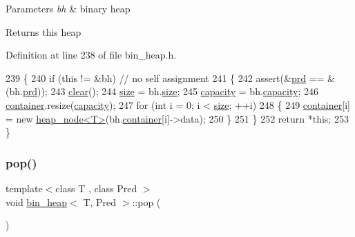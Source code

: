 \begin{DoxyParams}{Parameters}
{\em bh} & binary heap\\
\hline
\end{DoxyParams}
\begin{DoxyReturn}{Returns}
this heap 
\end{DoxyReturn}


Definition at line 238 of file bin\+\_\+heap.\+h.


\begin{DoxyCode}
239 \{
240     \textcolor{keywordflow}{if} (\textcolor{keyword}{this} != &bh)    \textcolor{comment}{// no self assignment}
241     \{
242     assert(&\mbox{\hyperlink{classbin__heap_a5ecc420dfd03a6a0b4c9328cac1fae14}{prd}} == &(bh.\mbox{\hyperlink{classbin__heap_a5ecc420dfd03a6a0b4c9328cac1fae14}{prd}}));
243     \mbox{\hyperlink{classbin__heap_abf7a6189fcb48e435fc156f764e38f1d}{clear}}();
244     \mbox{\hyperlink{classbin__heap_a8dde1008dcc24d734dbdb2c7ca50435b}{size}} = bh.\mbox{\hyperlink{classbin__heap_a8dde1008dcc24d734dbdb2c7ca50435b}{size}};
245     \mbox{\hyperlink{classbin__heap_ac5aa6948898bfc047cae2fe99ba28f57}{capacity}} = bh.\mbox{\hyperlink{classbin__heap_ac5aa6948898bfc047cae2fe99ba28f57}{capacity}};
246     \mbox{\hyperlink{classbin__heap_a413200f4c6e24090c5e9a32184fc8857}{container}}.resize(\mbox{\hyperlink{classbin__heap_ac5aa6948898bfc047cae2fe99ba28f57}{capacity}});
247     \textcolor{keywordflow}{for} (\textcolor{keywordtype}{int} i = 0; i < \mbox{\hyperlink{classbin__heap_a8dde1008dcc24d734dbdb2c7ca50435b}{size}}; ++i)
248     \{
249         \mbox{\hyperlink{classbin__heap_a413200f4c6e24090c5e9a32184fc8857}{container}}[i] = \textcolor{keyword}{new} \mbox{\hyperlink{classheap__node}{heap\_node<T>}}(bh.\mbox{\hyperlink{classbin__heap_a413200f4c6e24090c5e9a32184fc8857}{container}}[i]->data);
250     \}
251     \}
252     \textcolor{keywordflow}{return} *\textcolor{keyword}{this};
253 \}
\end{DoxyCode}
\mbox{\label{classbin__heap_ab463bc655b2f46cd5ff021cab28b1210}} 
\subsubsection{\texorpdfstring{pop()}{pop()}}
{\footnotesize\ttfamily template$<$class T , class Pred $>$ \\
void \mbox{\hyperlink{classbin__heap}{bin\+\_\+heap}}$<$ T, Pred $>$\+::pop (\begin{DoxyParamCaption}{ }\end{DoxyParamCaption})}



